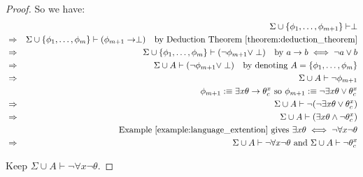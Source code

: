 \documentclass[11pt,letterpaper]{book}
\theoremstyle{definition}
\begin{document}
\begin{enumerate}
\begin{proof}
So we have:
\begin{eqnarray*}
    & & \Sigma \cup \{ \phi_1, \ldots, \phi_{m+1} \} \vdash \perp   \\
& \Rightarrow & \Sigma \cup \{ \phi_1, \ldots, \phi_m \} \vdash (
\phi_{m+1} \rightarrow \perp ) \quad \text{by Deduction Theorem
\ref{theorem:deduction_theorem}} \\
& \Rightarrow & \Sigma \cup \{ \phi_1, \ldots, \phi_m \} \vdash (  \lnot
\phi_{m+1} \lor \perp ) \quad \text{by } a \rightarrow b \iff \lnot a
\lor b \\
& \Rightarrow & \Sigma \cup A \vdash (  \lnot \phi_{m+1} \lor \perp )
\quad \text{by denoting } A = \{ \phi_1, \ldots, \phi_m \} \\
& \Rightarrow & \Sigma \cup A \vdash   \lnot \phi_{m+1} \\
& & \quad \phi_{m+1} :\equiv \exists x \theta  \rightarrow \theta_c ^x
\text{ so }  \phi_{m+1} :\equiv \lnot \exists x \theta \lor \theta_c ^x \\
& \Rightarrow & \Sigma \cup A \vdash   \lnot ( \lnot \exists x \theta
\lor \theta_c ^x ) \\
& \Rightarrow & \Sigma \cup A \vdash ( \exists x \theta \land \lnot
\theta_c ^x )   \\
& & \quad \text{Example \ref{example:language_extention} gives }
\exists x \theta \iff \lnot \forall x \lnot \theta \\
& \Rightarrow & \Sigma \cup A \vdash \lnot \forall x \lnot \theta \text{
and } \Sigma \cup A \vdash   \lnot \theta_c ^x
\end{eqnarray*}

Keep $\Sigma \cup A \vdash \lnot \forall x \lnot \theta$.


\end{proof}
\end{enumerate}
\end{document}
